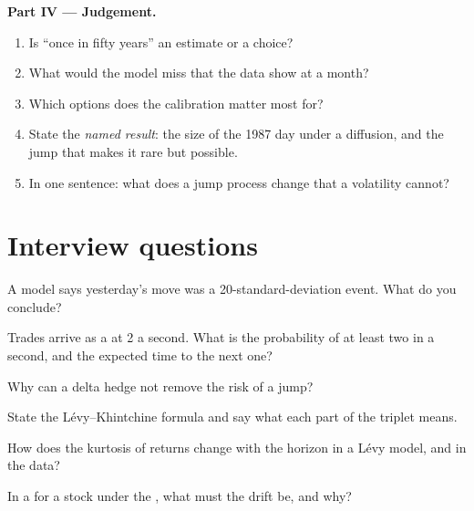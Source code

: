 \begin{problem}
\medskip\noindent\textbf{Part IV --- Judgement.}
\begin{enumerate}[resume]
\item Is ``once in fifty years'' an estimate or a choice?
\item What would the model miss that the data show at a month?
\item Which options does the calibration matter most for?
\item State the \emph{named result}: the size of the 1987 day under a diffusion, and the jump that makes it rare but possible.
\item In one sentence: what does a jump process change that a volatility cannot?
\end{enumerate}
\end{problem}

\section{Interview questions}

\begin{interviewq}\label{iq:qm:jump-processes:1}
A model says yesterday's move was a 20-standard-deviation event. What do you conclude?
\end{interviewq}

\begin{interviewq}\label{iq:qm:jump-processes:2}
Trades arrive as a  at 2 a second. What is the probability of at least two in a second, and
the expected time to the next one?
\end{interviewq}

\begin{interviewq}\label{iq:qm:jump-processes:3}
Why can a delta hedge not remove the risk of a jump?
\end{interviewq}

\begin{interviewq}\label{iq:qm:jump-processes:4}
State the Lévy--Khintchine formula and say what each part of the triplet means.
\end{interviewq}

\begin{interviewq}\label{iq:qm:jump-processes:5}
How does the kurtosis of returns change with the horizon in a Lévy model, and in the data?
\end{interviewq}

\begin{interviewq}\label{iq:qm:jump-processes:6}
In a  for a stock under the , what must the drift be, and why?
\end{interviewq}
